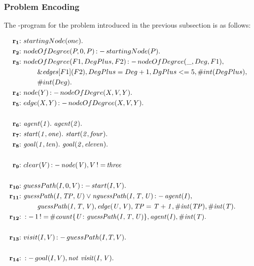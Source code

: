 \documentclass[a4paper, titlepage]{article}
\newcommand{\ext}[3]{\ensuremath{\&{\mathit{#1}}[#2](#3)}}
\DeclareMathOperator{\leftimpl}{:-}
\DeclareMathOperator{\nott}{\mathit{not}}
\DeclareMathOperator{\noteq}{!=}
\newcommand{\rowprefix}[1]{%
  \ensuremath{\color{black}\mathbf{#1{:}}\ }%
}
\begin{document}
\subsubsection{Problem Encoding}
The \hex-program for the problem introduced in the previous 
subsection is as follows:
\begin{exmp}
\label{pathfindingAgent}
\begin{align*}
\rowprefix{r_1} & startingNode(one). \\
\rowprefix{r_2} & nodeOfDegree(P,0,P) \leftimpl startingNode(P). 
\\
\rowprefix{r_3} & nodeOfDegree(F1, DegPlus, F2) \leftimpl 
nodeOfDegree(\_, Deg, F1), \\ & \qquad \ext{edges}{F1}{F2}, 
DegPlus=Deg+1, DgPlus <= 5, \#int(DegPlus), \\ & \qquad \#int(Deg). 
\\
\rowprefix{r_4} & node(Y) \leftimpl nodeOfDegre(X, V, Y).  \\
\rowprefix{r_5} & edge(X,Y) \leftimpl nodeOfDegree(X,V,Y).\\
\\
\rowprefix{r_6} &  \mathit{agent(1). } \ \mathit{ agent(2). }\\
\rowprefix{r_7} & \mathit{start(1,one).} \ \mathit{ 
start(2,four).} \\
\rowprefix{r_8} & \mathit{goal(1,ten).} \ \mathit{ 
goal(2,eleven).} \\
\\
\rowprefix{r_9} & clear(V) \leftimpl \mathit{node(V)}, V \noteq 
\mathit{three}\\ 
\\
\rowprefix{r_{10}} & guessPath(I,0,V) \leftimpl start(I,V). \\
\rowprefix{r_{11}} &  \mathit{guessPath(I, TP, U)} \vee 
\mathit{nguessPath(I, T, U)} \leftimpl 
\mathit{agent(I)}, \\ & \qquad  \mathit{guessPath(I, T, V)},  
\mathit{edge(U,V)}, \mathit{TP=T+1}, 
\mathit{\#int(TP)}, \mathit{\#int(T).}  \\
\rowprefix{r_{12}} &  \leftimpl 1 \noteq \mathit{\#count\{ U 
\colon guessPath(I, T, U) \}}, \mathit{agent(I)}, 
\mathit{\#int(T)}.  \\
\\
\rowprefix{r_{13}}&  visit(I, V) \leftimpl guessPath(I,T,V). \\
\\
\rowprefix{r_{14}} & \leftimpl goal(I, V), \nott \thinspace  
\mathit{visit(I, V).} \\

\end{align*}
\end{exmp}
\end{document}
